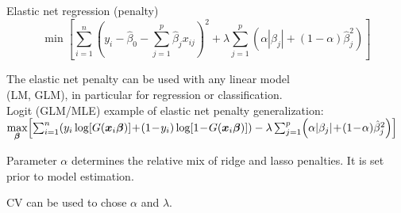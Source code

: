 \documentclass{beamer}
\begin{document}
\begin{frame}{Elastic net regression (penalty)}
$$\min \left[ \sum_{i=1}^n \left(y_i - \hat{\beta}_0 
         - \sum_{j=1}^p  \hat{\beta}_j x_{ij} \right)^2 
         \! + \lambda \sum_{j=1}^p 
         \left( \alpha |\beta_j| + (1-\alpha) \hat{\beta}_j^2 \right) \right]
$$
\begin{itemize}
\item The elastic net penalty can be used with any linear model \\(LM, GLM), in particular for regression or classification.\\
Logit (GLM/MLE) example of elastic net penalty generalization:\\
\footnotesize{$\underset{\bm{\beta}}{\textnormal{max}}\!
\left[
\sum_{i=1}^n \!\left( y_i \log [G(\bm{x}_i\bm{\beta})] \!+\! 
(1\!-\!y_i) \log [1\!-\!G(\bm{x}_i\bm{\beta})]
\right)
- \lambda \sum_{j=1}^p \!\left( \alpha |\beta_j|\!+\!(1\!-\!\alpha) \hat{\beta}_j^2 \right)
\right]$}
\smallskip
\normalsize{
\item Parameter $\alpha$ determines the relative mix of ridge and lasso penalties. It is set prior to model estimation.
\medskip
\item CV can be used to chose $\alpha$ and $\lambda$.}
\end{itemize}
\end{frame}
\end{document}
